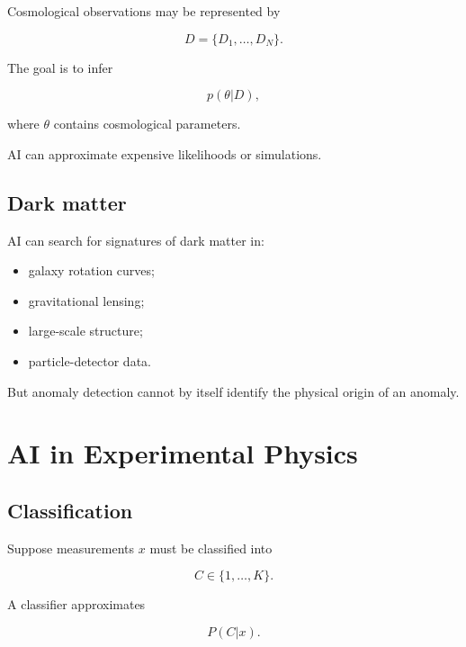 \documentclass[11pt,a4paper,oneside]{book}
\begin{document}
Cosmological observations may be represented by

\begin{equation}
D
=
\{D_1,\ldots,D_N\}.
\end{equation}

The goal is to infer

\begin{equation}
p(\theta|D),
\end{equation}

where $\theta$ contains cosmological parameters.

AI can approximate expensive likelihoods or simulations.

\section{Dark matter}

AI can search for signatures of dark matter in:

\begin{itemize}
\item galaxy rotation curves;
\item gravitational lensing;
\item large-scale structure;
\item particle-detector data.
\end{itemize}

But anomaly detection cannot by itself identify the physical origin of an
anomaly.

\chapter{AI in Experimental Physics}

\section{Classification}

Suppose measurements $x$ must be classified into

\begin{equation}
C\in\{1,\ldots,K\}.
\end{equation}

A classifier approximates

\begin{equation}
P(C|x).
\end{equation}
\end{document}
